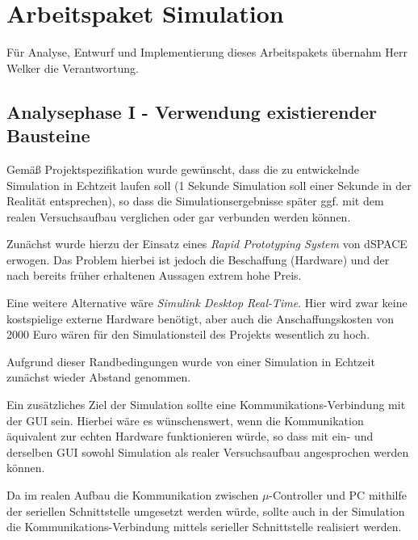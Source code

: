 





\chapter{Arbeitspaket Simulation}
Für Analyse, Entwurf und Implementierung dieses Arbeitspakets übernahm Herr Welker die Verantwortung.


\section{Analysephase I - Verwendung existierender Bausteine}
Gemäß Projektspezifikation wurde gewünscht, dass die zu entwickelnde Simulation in Echtzeit laufen soll (1 Sekunde Simulation soll einer Sekunde in der Realität entsprechen), so dass die Simulationsergebnisse später ggf. mit dem realen Versuchsaufbau verglichen oder gar verbunden werden können. 

Zunächst wurde hierzu der Einsatz eines \textit{Rapid Prototyping System} von dSPACE erwogen. %
Das Problem hierbei ist jedoch die Beschaffung (Hardware) und der nach bereits früher erhaltenen Aussagen extrem hohe Preis. 

Eine weitere Alternative wäre \textit{Simulink Desktop Real-Time}. %
Hier wird zwar keine kostspielige externe Hardware benötigt, aber auch die Anschaffungskosten von 2000 Euro %
wären für den Simulationsteil des Projekts wesentlich zu hoch. 

Aufgrund dieser Randbedingungen wurde von einer Simulation in Echtzeit zunächst wieder Abstand genommen.

Ein zusätzliches Ziel der Simulation sollte eine Kommunikations-Verbindung mit der GUI sein. Hierbei wäre es wünschenswert, wenn die Kommunikation äquivalent zur echten Hardware funktionieren würde, so dass mit ein- und derselben GUI sowohl Simulation als realer Versuchsaufbau angesprochen werden können. 

Da im realen Aufbau die Kommunikation zwischen $\mu$-Controller und PC mithilfe der seriellen Schnittstelle umgesetzt werden würde, sollte auch in der Simulation die Kommunikations-Verbindung mittels serieller Schnittstelle realisiert werden. 

